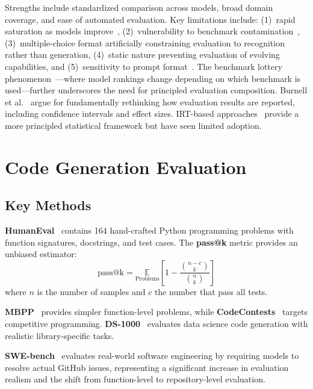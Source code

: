 \documentclass[11pt]{article}
\begin{document}
Strengths include standardized comparison across models, broad domain coverage, and ease of automated evaluation. Key limitations include: (1)~rapid saturation as models improve~\cite{alzahrani2024benchmarks}, (2)~vulnerability to benchmark contamination~\cite{yang2023rethinking,jacovi2023stop}, (3)~multiple-choice format artificially constraining evaluation to recognition rather than generation, (4)~static nature preventing evaluation of evolving capabilities, and (5)~sensitivity to prompt format~\cite{mizrahi2024stateofwhat}. The benchmark lottery phenomenon~\cite{dehghani2021benchmark}---where model rankings change depending on which benchmark is used---further underscores the need for principled evaluation composition. Burnell et al.~\cite{burnell2023rethink} argue for fundamentally rethinking how evaluation results are reported, including confidence intervals and effect sizes. IRT-based approaches~\cite{garg2023irt} provide a more principled statistical framework but have seen limited adoption.

\section{Code Generation Evaluation}
\label{sec:code}

\subsection{Key Methods}

\textbf{HumanEval}~\cite{chen2021evaluating} contains 164 hand-crafted Python programming problems with function signatures, docstrings, and test cases. The \textbf{pass@k} metric provides an unbiased estimator:
\begin{equation}
\text{pass@k} = \underset{\text{Problems}}{\mathbb{E}} \left[ 1 - \frac{\binom{n-c}{k}}{\binom{n}{k}} \right]
\end{equation}
where $n$ is the number of samples and $c$ the number that pass all tests.

\textbf{MBPP}~\cite{austin2021program} provides simpler function-level problems, while \textbf{CodeContests}~\cite{li2023competition} targets competitive programming. \textbf{DS-1000}~\cite{lai2023ds1000} evaluates data science code generation with realistic library-specific tasks.

\textbf{SWE-bench}~\cite{jimenez2024swebench} evaluates real-world software engineering by requiring models to resolve actual GitHub issues, representing a significant increase in evaluation realism and the shift from function-level to repository-level evaluation.
\end{document}
